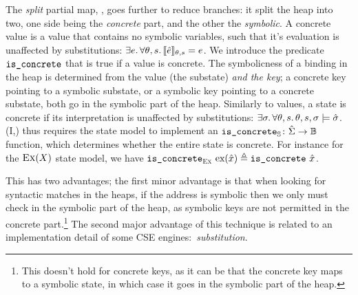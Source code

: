 The \emph{split} partial map, \SplitPMap, goes further to reduce branches: it split the heap into two, one side being the \emph{concrete} part, and the other the \emph{symbolic}. A concrete value is a value that contains no symbolic variables, such that it's evaluation is unaffected by substitutions: $\exists e\ldotp \forall \theta,s\ldotp \llbracket\hat{e}\rrbracket_{\theta,s}=e$. We introduce the predicate $\texttt{is\_concrete}$ that is true if a value is concrete. The symbolicness of a binding in the heap is determined from the value (the substate) \emph{and the key}; a concrete key pointing to a symbolic substate, or a symbolic key pointing to a concrete substate, both go in the symbolic part of the heap. Similarly to values, a state is concrete if its interpretation is unaffected by substitutions: ${\exists \sigma\ldotp \forall \theta,s\ldotp \theta,s,\sigma\models \hat{\sigma}}$. \SplitPMap(I,\mmdl) thus requires the state model to implement an $\texttt{is\_concrete}_{\mathbb S}\colon \hat{\Sigma} \rightarrow \mathbb{B}$ function, which determines whether the entire state is concrete. For instance for the $\textsc{Ex}(X)$ state model, we have ${\texttt{is\_concrete}_{\textsc{Ex}}~\text{ex}(\hat{x})\triangleq \texttt{is\_concrete}~\hat{x}}$.

This has two advantages; the first minor advantage is that when looking for syntactic matches in the heaps, if the address is symbolic then we only must check in the symbolic part of the heap, as symbolic keys are not permitted in the concrete part.\footnote{This doesn't hold for concrete keys, as it can be that the concrete key maps to a symbolic state, in which case it goes in the symbolic part of the heap.} The second major advantage of this technique is related to an implementation detail of some CSE engines:~\emph{substitution}.

